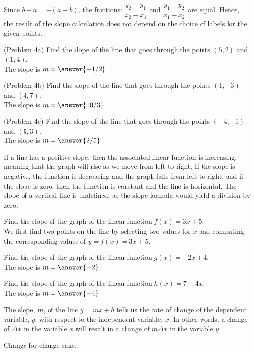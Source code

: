 \documentclass[handout]{ximera}
\begin{document}
\begin{remark}
Since $b-a = -(a-b)$, the fractions: $\dfrac{y_2 - y_1}{x_2 - x_1}$ and $\dfrac{y_1 - y_2}{x_1 - x_2}$
are equal.
Hence, the result of the slope calculation does not depend on the choice of labels for the given points.
\end{remark}

\begin{problem}(Problem 4a)
Find the slope of the line that goes through the points $(5, 2)$ and $(1, 4)$.\\
The slope is $m = \answer{-1/2}$
\end{problem}

\begin{problem}(Problem 4b)
Find the slope of the line that goes through the points $(1, -3)$ and $(4, 7)$.\\
The slope is $m = \answer{10/3}$
\end{problem}

\begin{problem}(Problem 4c)
Find the slope of the line that goes through the points $(-4, -1)$ and $(6, 3)$.\\
The slope is $m = \answer{2/5}$
\end{problem}

If a line has a positive slope, then the associated linear function is increasing, 
meaning that the graph will rise as we move from left to right. If the slope is negative, the function is decreasing and the 
graph falls from left to right, and if the slope is zero, then the function is constant and the line is horizontal.
The slope of a vertical line is undefined, as the slope formula would yield a division by zero.

\begin{example}[Example 5]
Find the slope of the graph of the linear function $f(x) = 3x + 5$. \\
We first find two points on the line by selecting two values for $x$ and computing the corresponding values 
of $y = f(x) = 3x + 5$.
\end{example}

\begin{problem}
Find the slope of the graph of the linear function $g(x) = -2x + 4$.\\
The slope is $m = \answer{-2}$
\end{problem}

\begin{problem}
Find the slope of the graph of the linear function $h(x) = 7 - 4x$.\\
The slope is $m = \answer{-4}$
\end{problem}

The slope, $m$, of the line $y = mx + b$ tells us the rate of change of the dependent variable, $y$, with respect to the independent 
variable, $x$. In other words, a change of $\Delta x$ in the variable $x$ will result in a change of $m \Delta x$ in the variable $y$.

Change for change sake.
\end{document}
